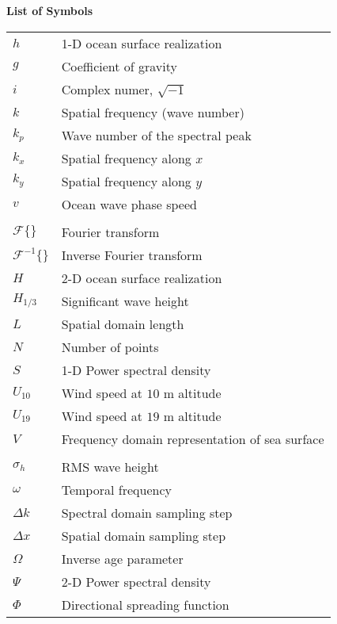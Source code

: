 \noindent\Large{\bf{List of Symbols}}

\vspace{24pt}

\small\normalsize
\begin{supertabular}{ll}
$h$ & 1-D ocean surface realization\\
$g$ & Coefficient of gravity \\
$i$ & Complex numer, $\sqrt{-1}$ \\
$k$ & Spatial frequency (wave number) \\
$k_p$ & Wave number of the spectral peak \\
$k_x$ & Spatial frequency along $x$ \\
$k_y$ & Spatial frequency along $y$ \\
$v$ & Ocean wave phase speed \\
\\
$\mathcal{F}\{\}$ & Fourier transform \\
$\mathcal{F}^{-1}\{\}$ & Inverse Fourier transform \\
$H$ & 2-D ocean surface realization\\
$H_{1/3}$ & Significant wave height \\
$L$ & Spatial domain length \\
$N$ & Number of points \\
$S$ & 1-D Power spectral density \\
$U_{10}$ & Wind speed at $10$ m altitude \\
$U_{19}$ & Wind speed at $19$ m altitude \\
$V$ & Frequency domain representation of sea surface\\
\\
$\sigma_h$ & RMS wave height \\
$\omega$ & Temporal frequency \\
$\Delta k$ & Spectral domain sampling step \\
$\Delta x$ & Spatial domain sampling step \\
$\Omega$ & Inverse age parameter \\
$\Psi $ & 2-D Power spectral density \\
$\Phi $ & Directional spreading function\\
\end{supertabular}